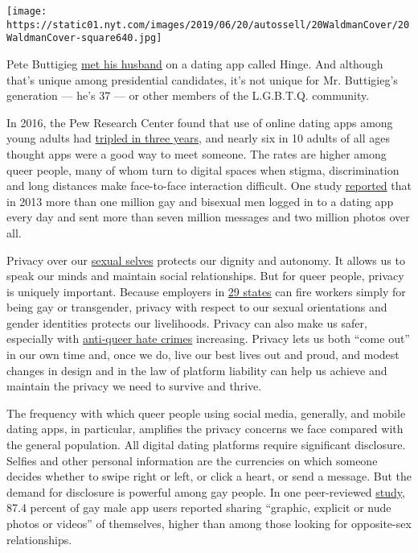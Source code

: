 \texttt{[image: https://static01.nyt.com/images/2019/06/20/autossell/20WaldmanCover/20WaldmanCover-square640.jpg]}

Pete Buttigieg
\href{https://www.nytimes.com/2018/06/18/fashion/weddings/mayor-peter-buttigieg-wedding-democratic-party.html}{met
his husband} on a dating app called Hinge. And although that's unique
among presidential candidates, it's not unique for Mr. Buttigieg's
generation --- he's 37 --- or other members of the L.G.B.T.Q. community.

In 2016, the Pew Research Center found that use of online dating apps
among young adults had
\href{https://www.pewresearch.org/fact-tank/2016/02/29/5-facts-about-online-dating/}{tripled
in three years}, and nearly six in 10 adults of all ages thought apps
were a good way to meet someone. The rates are higher among queer
people, many of whom turn to digital spaces when stigma, discrimination
and long distances make face-to-face interaction difficult. One study
\href{https://www.ncbi.nlm.nih.gov/pubmed/24754360}{reported} that in
2013 more than one million gay and bisexual men logged in to a dating
app every day and sent more than seven million messages and two million
photos over all.

Privacy over our
\href{https://www.yalelawjournal.org/article/sexual-privacy}{sexual
selves} protects our dignity and autonomy. It allows us to speak our
minds and maintain social relationships. But for queer people, privacy
is uniquely important. Because employers in
\href{https://www.hrc.org/state-maps/employment}{29 states} can fire
workers simply for being gay or transgender, privacy with respect to our
sexual orientations and gender identities protects our livelihoods.
Privacy can also make us safer, especially with
\href{https://www.nbcnews.com/feature/nbc-out/anti-lgbtq-hate-crimes-rose-3-percent-17-fbi-finds-n936166}{anti-queer
hate crimes} increasing. Privacy lets us both ``come out'' in our own
time and, once we do, live our best lives out and proud, and modest
changes in design and in the law of platform liability can help us
achieve and maintain the privacy we need to survive and thrive.

The frequency with which queer people using social media, generally, and
mobile dating apps, in particular, amplifies the privacy concerns we
face compared with the general population. All digital dating platforms
require significant disclosure. Selfies and other personal information
are the currencies on which someone decides whether to swipe right or
left, or click a heart, or send a message. But the demand for disclosure
is powerful among gay people. In one peer-reviewed
\href{https://www.cambridge.org/core/journals/law-and-social-inquiry/article/law-privacy-and-online-dating-revenge-porn-in-gay-online-communities/BCCE05CF25AA4C2E05CCF8D64980E839/core-reader}{study},
87.4 percent of gay male app users reported sharing ``graphic, explicit
or nude photos or videos'' of themselves, higher than among those
looking for opposite-sex relationships.

